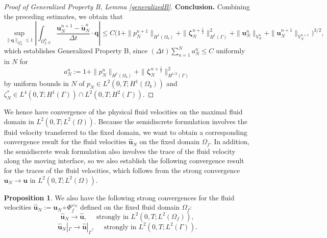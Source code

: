 \documentclass[11pt]{article}
\newcommand{\bd}{\boldsymbol}
\theoremstyle{definition}
\newtheorem{proposition}{Proposition}[section]
\begin{document}
\begin{proof}[Proof of Generalized Property B, Lemma \ref{generalizedB}]
\medskip

\noindent \textbf{Conclusion.} Combining the preceding estimates, we obtain that
\begin{equation*}
\sup_{\|\bd{q}\|_{Q^{n}_{N}} \le 1} \left|\int_{\Omega^{n}_{f, N}} \frac{\bd{u}^{n + 1}_{N} - \tilde{\bd{u}}^{n}_{N}}{\Delta t} \cdot \bd{q}\right| \le C\Big(1 + \|p^{n + 1}_{N}\|_{H^{1}(\Omega_{b})} + \|\bd{\zeta}^{n + \frac{1}{2}}_{N}\|^{2}_{H^{1}(\Gamma)} + \|\bd{u}^{n}_{N}\|_{V^{n}_{N}} + \|\bd{u}^{n + 1}_{N}\|_{V^{n + 1}_{N}}\Big)^{3/2},
\end{equation*}
which establishes Generalized Property B, since $\displaystyle (\Delta t) \sum_{n = 1}^{N} a^{n}_{N} \le C$ uniformly in $N$ for
\begin{equation*}
a^{n}_{N} := 1 + \|p^{n}_{N}\|_{H^{1}(\Omega_{b})} + \|\bd{\zeta}^{n + \frac{1}{2}}_{N}\|_{H^{1/2}(\Gamma)}^{2}
\end{equation*}
by uniform bounds in $N$ of $p_{N} \in L^{2}(0, T; H^{1}(\Omega_{b}))$ and $\zeta^{*}_{N} \in L^{4}(0, T; H^{1}(\Gamma)) \cap L^{2}(0, T; H^{2}(\Gamma))$.
\end{proof}

We hence have convergence of the physical fluid velocities on the maximal fluid domain in $L^{2}(0, T; L^{2}(\Omega))$. Because the semidiscrete formulation involves the fluid velocity transferred to the fixed domain, we want to obtain a corresponding convergence result for the fluid velocities $\hat{\bd{u}}_{N}$ on the fixed domain $\Omega_{f}$. In addition, the semidiscrete weak formulation also involves the trace of the fluid velocity along the moving interface, so we also establish the following convergence result for the traces of the fluid velocities, which follows from the strong convergence $\bd{u}_{N} \to \bd{u}$ in $L^{2}(0, T; L^{2}(\Omega))$.

\begin{proposition}\label{traceconvprop}
We also have the following strong convergences for the fluid velocities $\hat{\bd{u}}_{N} := \bd{u}_{N} \circ \Phi^{\omega_{N}}_{f}$ defined on the fixed fluid domain $\Omega_{f}$:
\begin{equation*}
\hat{\bd{u}}_{N} \to \hat{\bd{u}}, \quad \text{ strongly in $L^{2}(0, T; L^{2}(\Omega_{f}))$},
\end{equation*}
\begin{equation*}
\hat{\bd{u}}_{N}|_{\Gamma} \to \hat{\bd{u}}|_{\Gamma}, \quad \text{ strongly in $L^{2}(0, T; L^{2}(\Gamma))$}.
\end{equation*}
\end{proposition}
\end{document}
